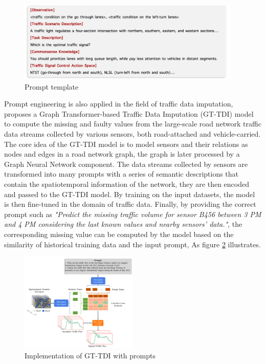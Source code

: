 \documentclass[runningheads]{llncs}
\begin{document}
\begin{figure}[H]
  \centering
  \includegraphics[width=0.95\textwidth]{Prompt LLMLight.PNG}
  \caption{Prompt template \cite{Lai23}}
  \label{fig:llmlight_prompt}
\end{figure} 
\noindent 
Prompt engineering is also applied in the field of traffic data imputation, \cite{Zhang24} proposes a Graph Transformer-based Traffic Data Imputation (GT-TDI) model to compute the missing and faulty values from 
the large-scale road network traffic data streams collected by various sensors, both road-attached and vehicle-carried. The core idea of the GT-TDI model is to model sensors and their relations as nodes and edges in 
a road network graph, the graph is later processed by a Graph Neural Network component. The data streams collected by sensors are transformed into many prompts with a series of semantic descriptions that contain the spatiotemporal information of the network,
they are then encoded and passed to the GT-TDI model. By training on the input datasets, the model is then fine-tuned in the domain of traffic data. Finally, by providing the correct prompt such as 
\textit{"Predict the missing traffic volume for sensor B456 between 3 PM and 4 PM considering the last known values and nearby sensors' data."}, the corresponding missing value can be computed by the model based on the similarity of historical training data
and the input prompt, As figure \ref{fig:TStreamLLM} illustrates. 

\begin{figure}[H]
  \centering
  \includegraphics[width=0.5\textwidth]{GT-TDI.png}
  \caption{Implementation of GT-TDI with prompts \cite{Zhang24}}
  \label{fig:TStreamLLM}
\end{figure}
\end{document}
